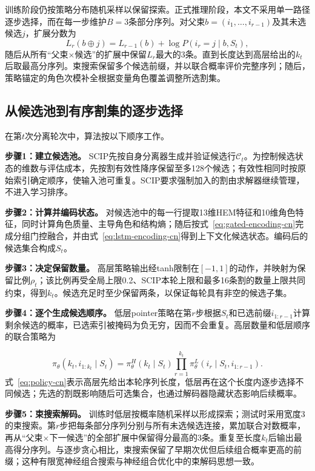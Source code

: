 \documentclass[final,5p,times,twocolumn]{elsarticle}
\begin{document}
训练阶段仍按策略分布随机采样以保留探索。正式推理阶段，本文不采用单一路径逐步选择，而在每一步维护$B=3$条部分序列。对父束$b=(i_1,\ldots,i_{r-1})$及其未选候选$j$，扩展分数为
\begin{equation}
L_r(b\oplus j)=L_{r-1}(b)+\log P(i_r=j\mid b,S_t),
\label{eq:beam-score-cn}
\end{equation}
随后从所有“父束$\times$候选”的扩展中保留$L_r$最大的3条。直到长度达到高层给出的$k_t$后取最高分序列。束搜索保留多个候选前缀，并以联合概率评价完整序列；随后，策略锚定的角色次模补全根据变量角色覆盖调整所选割集。

\subsection{从候选池到有序割集的逐步选择}

在第$t$次分离轮次中，算法按以下顺序工作。

\noindent\textbf{步骤1：建立候选池。} SCIP先按自身分离器生成并验证候选行$\mathcal C_t$。为控制候选状态的维数与评估成本，先按割有效性降序保留至多128个候选；有效性相同时按原始索引确定顺序，使输入池可重复。SCIP要求强制加入的割由求解器继续管理，不进入学习排序。

\noindent\textbf{步骤2：计算并编码状态。} 对候选池中的每一行提取13维HEM特征和10维角色特征，同时计算角色质量、主导角色和结构熵；随后按式~\eqref{eq:gated-encoding-cn}完成分组门控融合，并由式~\eqref{eq:lstm-encoding-cn}得到上下文化候选状态。编码后的候选集合构成$S_t$。

\noindent\textbf{步骤3：决定保留数量。} 高层策略输出经tanh限制在$[-1,1]$的动作，并映射为保留比例$\rho_t$；该比例再受全局上限0.2、SCIP本轮上限和最多16条割的数量上限共同约束，得到$k_t$。候选充足时至少保留两条，以保证每轮具有非空的候选子集。

\noindent\textbf{步骤4：逐个生成候选顺序。} 低层pointer策略在第$r$步根据$S_t$和已选前缀$i_{1:r-1}$计算剩余候选的概率，已选索引被掩码为负无穷，因而不会重复。高层数量和低层顺序的联合策略为

\begin{equation}
\pi_\theta(k_t,i_{1:k_t}\mid S_t)=\pi_\theta^H(k_t\mid S_t)
\prod_{r=1}^{k_t}\pi_\theta^L(i_r\mid S_t,i_{1:r-1}).
\label{eq:policy-cn}
\end{equation}
式~\eqref{eq:policy-cn}表示高层先给出本轮序列长度，低层再在这个长度内逐步选择不同候选；先选的割既影响随后可选集合，也通过解码器隐藏状态影响后续概率。

\noindent\textbf{步骤5：束搜索解码。} 训练时低层按概率随机采样以形成探索；测试时采用宽度3的束搜索。第$r$步把每条部分序列分别与所有未选候选连接，累加联合对数概率，再从“父束$\times$下一候选”的全部扩展中保留得分最高的3条。重复至长度$k_t$后输出最高得分序列。与逐步贪心相比，束搜索保留了早期次优但后续组合概率更高的前缀；这种有限宽神经组合搜索与神经组合优化中的束解码思想一致\citep{choo2022beam}。
\end{document}
